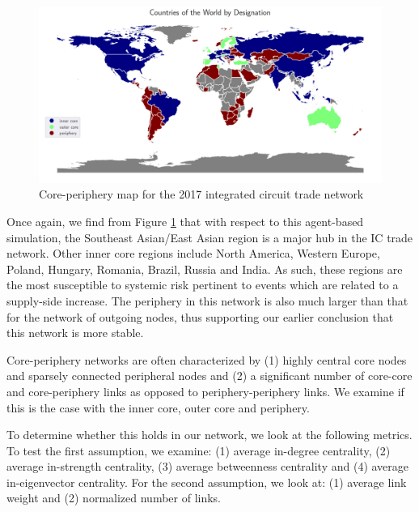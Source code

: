 \documentclass[12pt,letterpaper]{report}
\begin{document}
	\begin{figure}[!h]
		\centering
		\includegraphics[width=\textwidth]{Fig523-CorePeripheryMap.png}
		\caption{Core-periphery map for the 2017 integrated circuit trade network}\label{fig:521CorePeripheryMap}
	\end{figure}
	
	Once again, we find from Figure \ref{fig:521CorePeripheryMap} that with respect to this agent-based simulation, the Southeast Asian/East Asian region is a major hub in the IC trade network. Other inner core regions include North America, Western Europe, Poland, Hungary, Romania, Brazil, Russia and India. As such, these regions are the most susceptible to systemic risk pertinent to events which are related to a supply-side increase. The periphery in this network is also much larger than that for the network of outgoing nodes, thus supporting our earlier conclusion that this network is more stable.
	
	Core-periphery networks are often characterized by (1) highly central core nodes and sparsely connected peripheral nodes and (2) a significant number of core-core and core-periphery links as opposed to periphery-periphery links. We examine if this is the case with the inner core, outer core and periphery.
	
	To determine whether this holds in our network, we look at the following metrics. To test the first assumption, we examine: (1) average in-degree centrality, (2) average in-strength centrality, (3) average betweenness centrality and (4) average in-eigenvector centrality. For the second assumption, we look at: (1) average link weight and (2) normalized number of links.
\end{document}
